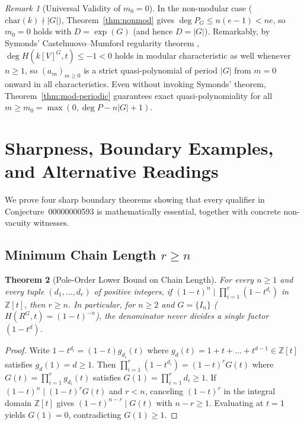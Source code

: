 \documentclass[11pt]{article}
\newtheorem{theorem}{Theorem}[section]
\theoremstyle{definition}
\theoremstyle{remark}
\newtheorem{remark}[theorem]{Remark}
\begin{document}
\begin{remark}[Universal Validity of $m_0 = 0$]
In the non-modular case ($\mathrm{char}(k) \nmid |G|$), Theorem~\ref{thm:nonmod} gives $\deg P_G \le n(e - 1) < ne$, so $m_0 = 0$ holds with $D = \exp(G)$ (and hence $D = |G|$). Remarkably, by Symonds' Castelnuovo--Mumford regularity theorem \cite[Corollary~0.3]{Symonds2011}, $\deg H(k[V]^G, t) \le -1 < 0$ holds in modular characteristic as well whenever $n \ge 1$, so $(a_m)_{m \ge 0}$ is a strict quasi-polynomial of period $|G|$ from $m = 0$ onward in all characteristics. Even without invoking Symonds' theorem, Theorem~\ref{thm:mod-periodic} guarantees exact quasi-polynomiality for all $m \ge m_0 = \max(0, \deg P - n|G| + 1)$.
\end{remark}

\section{Sharpness, Boundary Examples, and Alternative Readings}

We prove four sharp boundary theorems showing that every qualifier in Conjecture~00000000593 is mathematically essential, together with concrete non-vacuity witnesses.

\subsection{Minimum Chain Length \texorpdfstring{$r \ge n$}{r >= n}}

\begin{theorem}[Pole-Order Lower Bound on Chain Length]
\label{thm:min-len}
For every $n \ge 1$ and every tuple $(d_1,\dots,d_r)$ of positive integers, if $(1 - t)^n \mid \prod_{i=1}^r (1 - t^{d_i})$ in $\mathbb{Z}[t]$, then $r \ge n$. In particular, for $n \ge 2$ and $G = \{I_n\}$ ($H(R^G,t) = (1 - t)^{-n}$), the denominator never divides a single factor $(1 - t^d)$.
\end{theorem}

\begin{proof}
Write $1 - t^{d_i} = (1 - t) g_{d_i}(t)$ where $g_d(t) = 1 + t + \dots + t^{d-1} \in \mathbb{Z}[t]$ satisfies $g_d(1) = d \ge 1$. Then $\prod_{i=1}^r (1 - t^{d_i}) = (1 - t)^r G(t)$ where $G(t) = \prod_{i=1}^r g_{d_i}(t)$ satisfies $G(1) = \prod_{i=1}^r d_i \ge 1$. If $(1 - t)^n \mid (1 - t)^r G(t)$ and $r < n$, canceling $(1 - t)^r$ in the integral domain $\mathbb{Z}[t]$ gives $(1 - t)^{n-r} \mid G(t)$ with $n - r \ge 1$. Evaluating at $t = 1$ yields $G(1) = 0$, contradicting $G(1) \ge 1$.
\end{proof}
\end{document}
